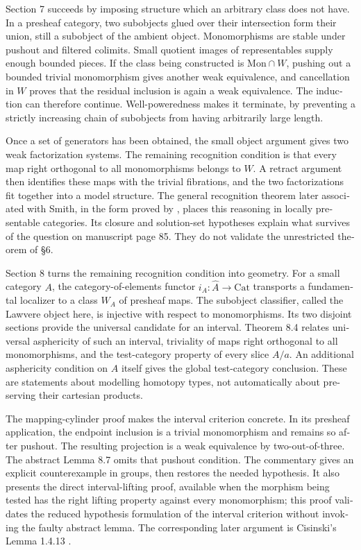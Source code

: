 \begin{otherlanguage}{english}
Section 7 succeeds by imposing structure which an arbitrary class does not have. In a presheaf category, two subobjects glued over their intersection form their union, still a subobject of the ambient object. Monomorphisms are stable under pushout and filtered colimits. Small quotient images of representables supply enough bounded pieces. If the class being constructed is $\mathrm{Mon}\cap W$, pushing out a bounded trivial monomorphism gives another weak equivalence, and cancellation in $W$ proves that the residual inclusion is again a weak equivalence. The induction can therefore continue. Well-poweredness makes it terminate, by preventing a strictly increasing chain of subobjects from having arbitrarily large length.

Once a set of generators has been obtained, the small object argument gives two weak factorization systems. The remaining recognition condition is that every map right orthogonal to all monomorphisms belongs to $W$. A retract argument then identifies these maps with the trivial fibrations, and the two factorizations fit together into a model structure. The general recognition theorem later associated with Smith, in the form proved by \citet[Theorem 1.7]{Beke2000}, places this reasoning in locally presentable categories. Its closure and solution-set hypotheses explain what survives of the question on manuscript page 85. They do not validate the unrestricted theorem of \S6.

Section 8 turns the remaining recognition condition into geometry. For a small category $A$, the category-of-elements functor $i_A:\widehat A\to\mathrm{Cat}$ transports a fundamental localizer to a class $W_A$ of presheaf maps. The subobject classifier, called the Lawvere object here, is injective with respect to monomorphisms. Its two disjoint sections provide the universal candidate for an interval. Theorem 8.4 relates universal asphericity of such an interval, triviality of maps right orthogonal to all monomorphisms, and the test-category property of every slice $A/a$. An additional asphericity condition on $A$ itself gives the global test-category conclusion. These are statements about modelling homotopy types, not automatically about preserving their cartesian products.

The mapping-cylinder proof makes the interval criterion concrete. In its presheaf application, the endpoint inclusion is a trivial monomorphism and remains so after pushout. The resulting projection is a weak equivalence by two-out-of-three. The abstract Lemma 8.7 omits that pushout condition. The commentary gives an explicit counterexample in groups, then restores the needed hypothesis. It also presents the direct interval-lifting proof, available when the morphism being tested has the right lifting property against every monomorphism; this proof validates the reduced hypothesis formulation of the interval criterion without invoking the faulty abstract lemma. The corresponding later argument is Cisinski's Lemma 1.4.13 \citep{Cisinski2006}.


\end{otherlanguage}
